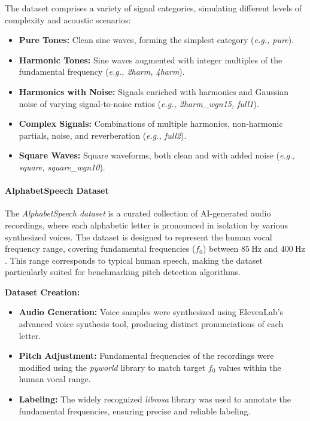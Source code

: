 \documentclass{ieeeaccess}
\begin{document}
The dataset comprises a variety of signal categories, simulating different levels of complexity and acoustic scenarios:
\begin{itemize}
    \item \textbf{Pure Tones:} Clean sine waves, forming the simplest category (\textit{e.g., pure}).
    \item \textbf{Harmonic Tones:} Sine waves augmented with integer multiples of the fundamental frequency (\textit{e.g., 2harm, 4harm}).
    \item \textbf{Harmonics with Noise:} Signals enriched with harmonics and Gaussian noise of varying signal-to-noise ratios (\textit{e.g., 2harm\_wgn15, full1}).
    \item \textbf{Complex Signals:} Combinations of multiple harmonics, non-harmonic partials, noise, and reverberation (\textit{e.g., full2}).
    \item \textbf{Square Waves:} Square waveforms, both clean and with added noise (\textit{e.g., square, square_wgn10}).
\end{itemize}

\paragraph{AlphabetSpeech Dataset}
The \textit{AlphabetSpeech dataset} is a curated collection of AI-generated audio recordings, where each alphabetic letter is pronounced in isolation by various synthesized voices. The dataset is designed to represent the human vocal frequency range, covering fundamental frequencies (\( f_0 \)) between \( 85 \ \text{Hz} \) and \( 400 \ \text{Hz} \). This range corresponds to typical human speech, making the dataset particularly suited for benchmarking pitch detection algorithms.

\textbf{Dataset Creation:}
\begin{itemize}
    \item \textbf{Audio Generation:} Voice samples were synthesized using ElevenLab’s advanced voice synthesis tool, producing distinct pronunciations of each letter.
    \item \textbf{Pitch Adjustment:} Fundamental frequencies of the recordings were modified using the \textit{pyworld} library to match target \( f_0 \) values within the human vocal range.
    \item \textbf{Labeling:} The widely recognized \textit{librosa} library was used to annotate the fundamental frequencies, ensuring precise and reliable labeling.
\end{itemize}
\end{document}
